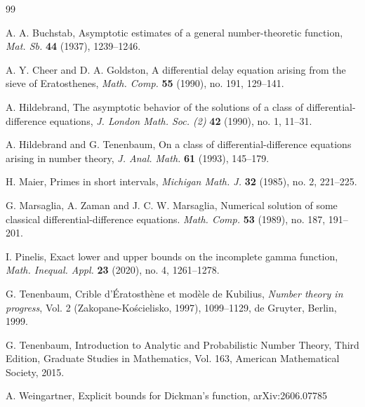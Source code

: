 \documentclass[11pt]{amsart}
\begin{document}
\begin{thebibliography}{99}

A. A. Buchstab, 
Asymptotic estimates of a general number-theoretic function, 
\textit{Mat. Sb.} \textbf{44} (1937), 1239--1246.

A. Y. Cheer and D. A. Goldston, 
A differential delay equation arising from the sieve of Eratosthenes,
\textit{Math. Comp.} \textbf{55} (1990), no. 191, 129--141.

A. Hildebrand, 
The asymptotic behavior of the solutions of a class of differential-difference equations,
\textit{J. London Math. Soc. (2)} \textbf{42} (1990), no. 1, 11--31.

A. Hildebrand and G. Tenenbaum,
On a class of differential-difference equations arising in number theory,
\textit{J. Anal. Math.} \textbf{61} (1993), 145--179.

H. Maier,
Primes in short intervals,
\textit{Michigan Math. J.} \textbf{32} (1985), no. 2, 221--225.

G. Marsaglia, A. Zaman and J. C. W. Marsaglia, 
Numerical solution of some classical differential-difference equations.
\textit{Math. Comp.} \textbf{53} (1989), no. 187, 191--201.

I. Pinelis,
Exact lower and upper bounds on the incomplete gamma function,
\textit{Math. Inequal. Appl.} \textbf{23} (2020), no. 4, 1261--1278.

G. Tenenbaum,
Crible d'\'Eratosth\`ene et mod\`ele de Kubilius,
\textit{Number theory in progress}, Vol. 2 (Zakopane-Ko\'scielisko, 1997), 1099--1129, de Gruyter, Berlin, 1999.

G. Tenenbaum, Introduction to Analytic and Probabilistic Number Theory, Third Edition, Graduate Studies in Mathematics, Vol. 163, American Mathematical Society, 2015.

A. Weingartner,
Explicit bounds for Dickman's function, arXiv:2606.07785


\end{thebibliography}
\end{document}
